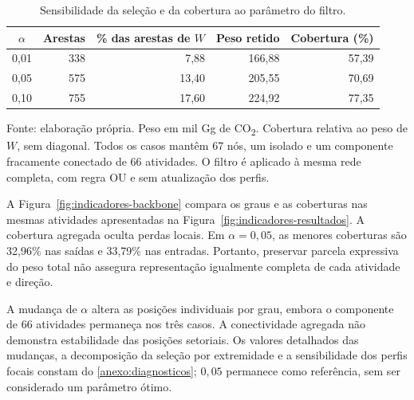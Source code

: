 \begin{table}[htbp]
\centering
\caption{Sensibilidade da seleção e da cobertura ao parâmetro do filtro.}
\label{tab:sensibilidade-backbone}
\small
\begin{tabular}{@{}crrrr@{}}
\toprule
$\alpha$ & Arestas & \% das arestas de $W$ & Peso retido & Cobertura (\%) \\
\midrule
0,01 & 338 & 7,88 & 166,88 & 57,39 \\
0,05 & 575 & 13,40 & 205,55 & 70,69 \\
0,10 & 755 & 17,60 & 224,92 & 77,35 \\
\bottomrule
\end{tabular}
\par\smallskip\begin{minipage}{\textwidth}\footnotesize
Fonte: elaboração própria. Peso em mil Gg de CO\textsubscript{2}. Cobertura relativa ao peso de $W$, sem diagonal. Todos os casos mantêm 67 nós, um isolado e um componente fracamente conectado de 66 atividades. O filtro é aplicado à mesma rede completa, com regra OU e sem atualização dos perfis.
\end{minipage}
\end{table}

A Figura~\ref{fig:indicadores-backbone} compara os graus e as coberturas nas mesmas atividades apresentadas na Figura~\ref{fig:indicadores-resultados}. A cobertura agregada oculta perdas locais. Em $\alpha=0{,}05$, as menores coberturas são 32,96\% nas saídas e 33,79\% nas entradas. Portanto, preservar parcela expressiva do peso total não assegura representação igualmente completa de cada atividade e direção.

A mudança de $\alpha$ altera as posições individuais por grau, embora o componente de 66 atividades permaneça nos três casos. A conectividade agregada não demonstra estabilidade das posições setoriais. Os valores detalhados das mudanças, a decomposição da seleção por extremidade e a sensibilidade dos perfis focais constam do \ref{anexo:diagnosticos}; $0{,}05$ permanece como referência, sem ser considerado um parâmetro ótimo.





